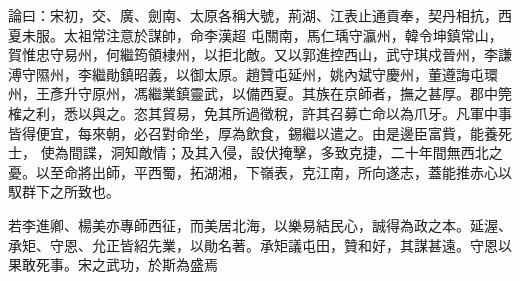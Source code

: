 \begin{pinyinscope}
 論曰：宋初，交、廣、劍南、太原各稱大號，荊湖、江表止通貢奉，契丹相抗，西夏未服。太祖常注意於謀帥，命李漢超
 屯關南，馬仁瑀守瀛州，韓令坤鎮常山，賀惟忠守易州，何繼筠領棣州，以拒北敵。又以郭進控西山，武守琪戍晉州，李謙溥守隰州，李繼勛鎮昭義，以御太原。趙贊屯延州，姚內斌守慶州，董遵誨屯環州，王彥升守原州，馮繼業鎮靈武，以備西夏。其族在京師者，撫之甚厚。郡中筦榷之利，悉以與之。恣其貿易，免其所過徵稅，許其召募亡命以為爪牙。凡軍中事皆得便宜，每來朝，必召對命坐，厚為飲食，錫繼以遣之。由是邊臣富貲，能養死士，
 使為間諜，洞知敵情；及其入侵，設伏掩擊，多致克捷，二十年間無西北之憂。以至命將出師，平西蜀，拓湖湘，下嶺表，克江南，所向遂志，蓋能推赤心以馭群下之所致也。



 若李進卿、楊美亦專師西征，而美居北海，以樂易結民心，誠得為政之本。延渥、承矩、守恩、允正皆紹先業，以勛名著。承矩議屯田，贊和好，其謀甚遠。守恩以果敢死事。宋之武功，於斯為盛焉



\end{pinyinscope}